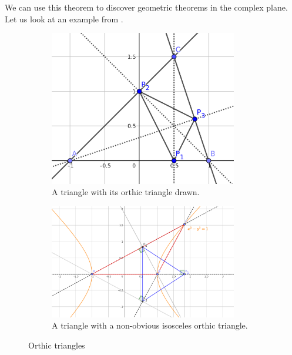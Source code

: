 We can use this theorem to discover geometric theorems in the complex plane. Let us look at an example from \cite{MONTES20101391}.


\begin{figure}[t]
  \centering
  \begin{subfigure}{0.4\textwidth}
    \centering
    \includegraphics[width=0.9\textwidth]{geogebra_setup.png}
    \caption{A triangle with its orthic triangle drawn.}\label{fig:orthic_setup}
  \end{subfigure}%
  \begin{subfigure}{0.6\textwidth}
    \centering
    \includegraphics[width=0.9\textwidth]{geogebra_orthic.png}
    \caption{A triangle with a non-obvious isosceles orthic triangle.}\label{fig:orthic_solution}
  \end{subfigure}
  \caption{Orthic triangles}\label{fig:orthic}
\end{figure}

